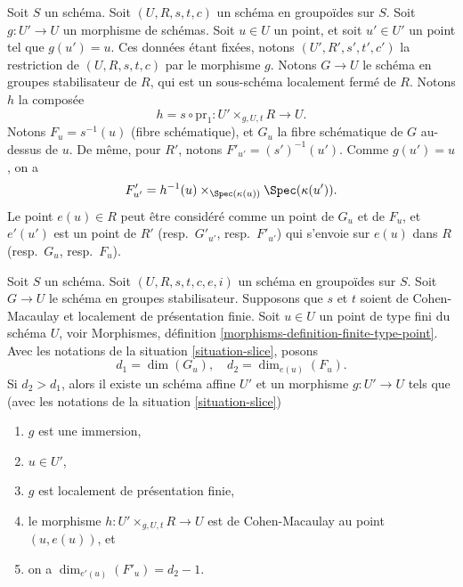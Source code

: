 \begin{situation}
\label{situation-slice}
Soit $S$ un schéma.
Soit $(U, R, s, t, c)$ un schéma en groupoïdes sur $S$.
Soit $g : U' \to U$ un morphisme de schémas.
Soit $u \in U$ un point, et soit $u' \in U'$ un point tel que
$g(u') = u$. Ces données étant fixées, notons $(U', R', s', t', c')$
la restriction de $(U, R, s, t, c)$ par le morphisme $g$.
Notons $G \to U$ le schéma en groupes stabilisateur de $R$, qui
est un sous-schéma localement fermé de $R$.
Notons $h$ la composée
$$
h = s \circ \text{pr}_1 : U' \times_{g, U, t} R \longrightarrow U.
$$
Notons $F_u = s^{-1}(u)$ (fibre schématique), et $G_u$ la
fibre schématique de $G$ au-dessus de $u$.
De même, pour $R'$, notons $F'_{u'} = (s')^{-1}(u')$.
Comme $g(u') = u$, on a
$$
F'_{u'} = h^{-1}(u) \times_{\Spec(\kappa(u))} \Spec(\kappa(u')).
$$
Le point $e(u) \in R$ peut être considéré comme un point de $G_u$ et de $F_u$, et
$e'(u')$ est un point de $R'$ (resp.\ $G'_{u'}$, resp.\ $F'_{u'}$) qui s'envoie
sur $e(u)$ dans $R$ (resp.\ $G_u$, resp.\ $F_u$).
\end{situation}

\begin{lemma}
\label{lemma-slice}
Soit $S$ un schéma.
Soit $(U, R, s, t, c, e, i)$ un schéma en groupoïdes sur $S$.
Soit $G \to U$ le schéma en groupes stabilisateur.
Supposons que $s$ et $t$ soient de Cohen-Macaulay et localement de présentation finie.
Soit $u \in U$ un point de type fini du schéma $U$, voir
Morphismes, définition \ref{morphisms-definition-finite-type-point}.
Avec les notations de la
situation \ref{situation-slice},
posons
$$
d_1 = \dim(G_u), \quad
d_2 = \dim_{e(u)}(F_u).
$$
Si $d_2 > d_1$, alors il existe un schéma affine $U'$
et un morphisme $g : U' \to U$ tels que (avec les notations de la
situation \ref{situation-slice})
\begin{enumerate}
\item $g$ est une immersion,
\item $u \in U'$,
\item $g$ est localement de présentation finie,
\item le morphisme $h : U' \times_{g, U, t} R \longrightarrow U$
est de Cohen-Macaulay au point $(u, e(u))$, et
\item on a $\dim_{e'(u)}(F'_u) = d_2 - 1$.
\end{enumerate}
\end{lemma}

